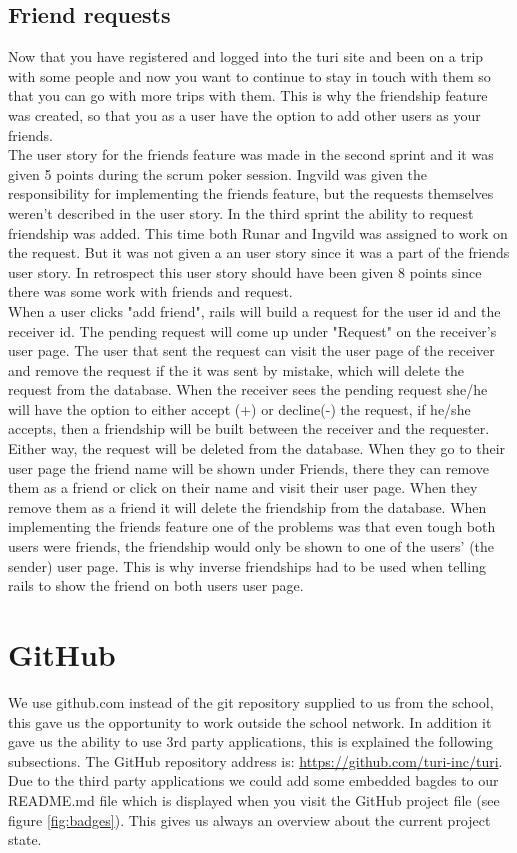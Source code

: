 \documentclass[a4paper]{article}
\begin{document}
\subsection{Friend requests}
Now that you have registered and logged into the turi site and been on a trip with some people and now you want to continue to stay in touch with them so that you can go with more trips with them. This is why the friendship feature was created, so that you as a user have the option to add other users as your friends. \\

\noindent
The user story for the friends feature was made in the second sprint and it was given 5 points during the scrum poker session. Ingvild was given the responsibility for implementing the friends feature, but the requests themselves weren't described in the user story. In the third sprint the ability to request friendship was added. This time both Runar and Ingvild was assigned to work on the request. But it was not given a an user story since it was a part of the friends user story. In retrospect this user story should have been given 8 points since there was some work with friends and request. \\

\noindent
When a user clicks "add friend", rails will build a request for the user id and the receiver id. The pending request will come up under "Request" on the receiver's user page. The user that sent the request can visit the user page of the receiver and remove the request if the it was sent by mistake, which will delete the request from the database. When the receiver sees the pending request she/he will have the option to either accept (+) or decline(-) the request, if he/she accepts, then a friendship will be built between the receiver and the requester. Either way, the request will be deleted from the database. When they go to their user page the friend name will be shown under Friends, there they can remove them as a friend or click on their name and visit their user page. When they remove them as a friend it will delete the friendship from the database. When implementing the friends feature one of the problems was that even tough both users were friends, the friendship would only be shown to one of the users' (the sender) user page. This is why inverse friendships had to be used when telling rails to show the friend on both users user page. \\

\section{GitHub}
We use github.com instead of the git repository supplied to us from the school, this gave us the opportunity to work outside the school network. In addition it gave us the ability to use 3rd party applications, this is explained the following subsections. The GitHub repository address is: \url{https://github.com/turi-inc/turi}. Due to the third party applications we could add some embedded bagdes to our README.md file which is displayed when you visit the GitHub project file (see figure \ref{fig:badges}). This gives us always an overview about the current project state.
\end{document}
